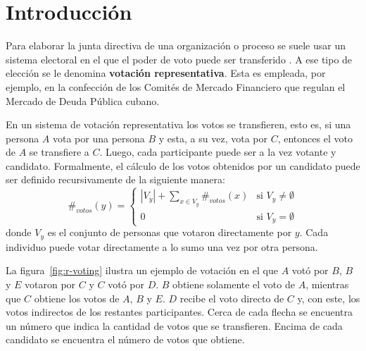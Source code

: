 \chapter*{Introducción}\label{chapter:introduction}

Para elaborar la junta directiva de una organizaci\'on o proceso se suele usar un sistema electoral en el que el poder de voto puede ser transferido \citep{proxy-vote}.   A ese tipo de elecci\'on se le denomina \textbf{votaci\'on representativa}.   Esta es empleada, por ejemplo, en la confecci\'on de los Comit\'es de Mercado Financiero que regulan el Mercado de Deuda P\'ublica cubano. 

En un sistema de votaci\'on representativa  los votos se transfieren, esto es, si una persona $A$ vota por una persona $B$ y esta, a su vez, vota por  $C$, entonces el voto de $A$ se transfiere a $C$. Luego, cada participante puede ser a la vez votante y candidato. Formalmente, el c\'alculo de los votos obtenidos por un candidato puede ser definido recursivamente de la siguiente manera:
\begin{equation}\label{eq:votes-count}
    \#_{votos}(y) = \begin{cases}
        |V_y| + \underset{x \in V_y}{\sum} \#_{votos}(x) & \text{si } V_y \neq \emptyset \\
        0 & \text{si } V_y = \emptyset 
    \end{cases}
\end{equation}
donde $V_y$ es el conjunto de personas que votaron directamente por $y$. Cada individuo puede votar directamente a lo sumo una vez por otra persona. 

La figura~\ref{fig:r-voting} ilustra un ejemplo de votación en el que $A$ votó por $B$, $B$ y $E$ votaron por $C$ y $C$ votó por $D$. $B$ obtiene solamente el voto de $A$, mientras que $C$ obtiene los votos de $A$, $B$ y $E$. $D$ recibe el voto directo de $C$ y, con este,  los votos indirectos de los restantes participantes. Cerca de cada flecha se encuentra un n\'umero que indica la cantidad de votos que se transfieren. Encima de cada candidato se encuentra el n\'umero de votos que obtiene.

